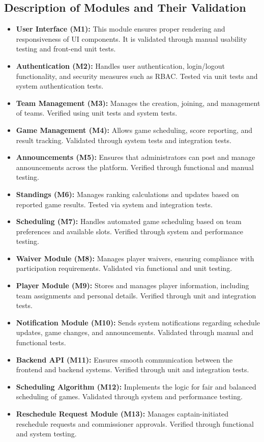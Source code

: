 \documentclass[12pt, titlepage]{article}
\begin{document}
\subsection*{Description of Modules and Their Validation}

\begin{itemize}
    \item \textbf{User Interface (M1):} This module ensures proper rendering and responsiveness of UI components. It is validated through manual usability testing and front-end unit tests.
    \item \textbf{Authentication (M2):} Handles user authentication, login/logout functionality, and security measures such as RBAC. Tested via unit tests and system authentication tests.
    \item \textbf{Team Management (M3):} Manages the creation, joining, and management of teams. Verified using unit tests and system tests.
    \item \textbf{Game Management (M4):} Allows game scheduling, score reporting, and result tracking. Validated through system tests and integration tests.
    \item \textbf{Announcements (M5):} Ensures that administrators can post and manage announcements across the platform. Verified through functional and manual testing.
    \item \textbf{Standings (M6):} Manages ranking calculations and updates based on reported game results. Tested via system and integration tests.
    \item \textbf{Scheduling (M7):} Handles automated game scheduling based on team preferences and available slots. Verified through system and performance testing.
    \item \textbf{Waiver Module (M8):} Manages player waivers, ensuring compliance with participation requirements. Validated via functional and unit testing.
    \item \textbf{Player Module (M9):} Stores and manages player information, including team assignments and personal details. Verified through unit and integration tests.
    \item \textbf{Notification Module (M10):} Sends system notifications regarding schedule updates, game changes, and announcements. Validated through manual and functional tests.
    \item \textbf{Backend API (M11):} Ensures smooth communication between the frontend and backend systems. Verified through unit and integration tests.
    \item \textbf{Scheduling Algorithm (M12):} Implements the logic for fair and balanced scheduling of games. Validated through system and performance testing.
    \item \textbf{Reschedule Request Module (M13):} Manages captain-initiated reschedule requests and commissioner approvals. Verified through functional and system testing.
\end{itemize}
\end{document}
